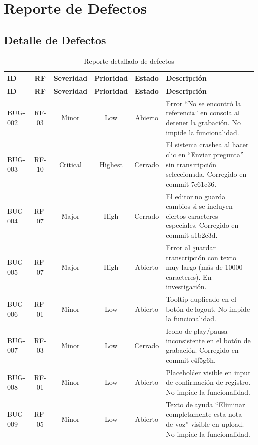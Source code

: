 \chapter{Reporte de Defectos}
\label{apendice:c}

\section{Detalle de Defectos}

\begin{longtable}{lccccp{5cm}}
\caption{Reporte detallado de defectos}
\label{tab:reporte-defectos}\\
\toprule
\textbf{ID} & \textbf{RF} & \textbf{Severidad} & \textbf{Prioridad} & \textbf{Estado} & \textbf{Descripción}\\
\midrule
\endfirsthead
\toprule
\textbf{ID} & \textbf{RF} & \textbf{Severidad} & \textbf{Prioridad} & \textbf{Estado} & \textbf{Descripción}\\
\midrule
\endhead
\bottomrule
\endfoot

BUG-002 & RF-03 & Minor & Low & Abierto & Error ``No se encontró la referencia'' en consola al detener la grabación. No impide la funcionalidad.\\

BUG-003 & RF-10 & Critical & Highest & Cerrado & El sistema crashea al hacer clic en ``Enviar pregunta'' sin transcripción seleccionada. Corregido en commit 7e61c36.\\

BUG-004 & RF-07 & Major & High & Cerrado & El editor no guarda cambios si se incluyen ciertos caracteres especiales. Corregido en commit a1b2c3d.\\

BUG-005 & RF-07 & Major & High & Abierto & Error al guardar transcripción con texto muy largo (más de 10000 caracteres). En investigación.\\

BUG-006 & RF-01 & Minor & Low & Abierto & Tooltip duplicado en el botón de logout. No impide la funcionalidad.\\

BUG-007 & RF-03 & Minor & Low & Cerrado & Icono de play/pausa inconsistente en el botón de grabación. Corregido en commit e4f5g6h.\\

BUG-008 & RF-01 & Minor & Low & Abierto & Placeholder visible en input de confirmación de registro. No impide la funcionalidad.\\

BUG-009 & RF-05 & Minor & Low & Abierto & Texto de ayuda ``Eliminar completamente esta nota de voz'' visible en upload. No impide la funcionalidad.\\

\bottomrule
\end{longtable}

